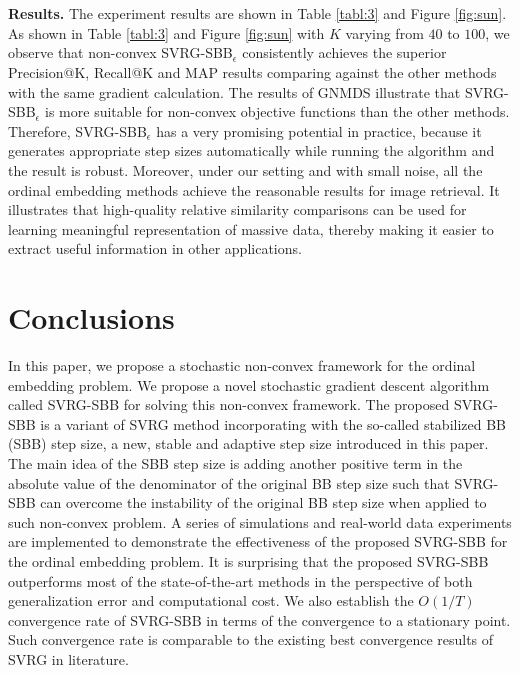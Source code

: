 \documentclass[letterpaper]{article} %
\begin{document}
\\\\
\textbf{Results.} The experiment results are shown in Table \ref{tabl:3} and Figure \ref{fig:sun}.
As shown in Table \ref{tabl:3} and Figure \ref{fig:sun} with $K$ varying from $40$ to $100$, we observe that non-convex SVRG-SBB$_\epsilon$ consistently achieves the superior Precision@K, Recall@K and MAP results comparing against the other methods with the same gradient calculation. The results of GNMDS illustrate that SVRG-SBB$_\epsilon$ is more suitable for non-convex objective functions than the other methods. Therefore, SVRG-SBB$_\epsilon$ has a very promising potential in practice, because it generates appropriate step sizes automatically while running the algorithm and the result is robust. Moreover, under our setting and with small noise, all the ordinal embedding methods achieve the reasonable results for image retrieval. It illustrates that high-quality relative similarity comparisons can be used for learning meaningful representation of massive data, thereby making it easier to extract useful information in other applications.

\section{Conclusions}

In this paper, we propose a stochastic non-convex framework for the ordinal embedding problem. We propose a novel stochastic gradient descent algorithm called SVRG-SBB for solving this non-convex framework. The proposed SVRG-SBB is a variant of SVRG method incorporating with the so-called stabilized BB (SBB) step size, a new, stable and adaptive step size introduced in this paper. The main idea of the SBB step size is adding another positive term in the absolute value of the denominator of the original BB step size such that SVRG-SBB can overcome the instability of the original BB step size when applied to such non-convex problem. A series of simulations and real-world data experiments are implemented to demonstrate the effectiveness of the proposed SVRG-SBB for the ordinal embedding problem. It is surprising that the proposed SVRG-SBB outperforms most of the state-of-the-art methods in the perspective of both generalization error and computational cost. We also establish the $O(1/T)$ convergence rate of SVRG-SBB in terms of the convergence to a stationary point. Such convergence rate is comparable to the existing best convergence results of SVRG in literature.
\end{document}

